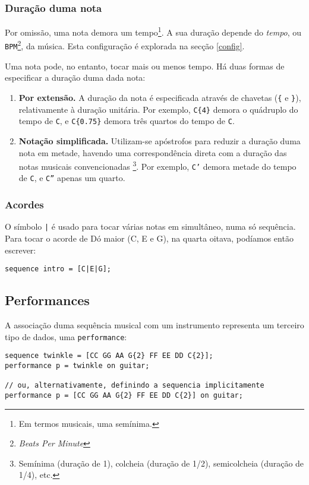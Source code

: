 \documentclass{article}
\begin{document}
\subsubsection{Duração duma nota}
Por omissão, uma nota demora um tempo\footnote{Em termos musicais, uma semínima.}. A sua duração depende do \textit{tempo}, ou \texttt{BPM}\footnote{\textit{Beats Per Minute}}, da música. Esta configuração é explorada na secção \ref{config}.

Uma nota pode, no entanto, tocar mais ou menos tempo. Há duas formas de especificar a duração duma dada nota:
\begin{enumerate}
    \item \textbf{Por extensão.} A duração da nota é especificada através de chavetas (\texttt{\{} e \texttt{\}}), relativamente à duração unitária. Por exemplo, \texttt{C\{4\}} demora o quádruplo do tempo de \texttt{C}, e \texttt{C\{0.75\}} demora três quartos do tempo de \texttt{C}.
    \item \textbf{Notação simplificada.} Utilizam-se apóstrofos para reduzir a duração duma nota em metade, havendo uma correspondência direta com a duração das notas musicais convencionadas
    \footnote{Semínima (duração de 1), colcheia (duração de 1/2), semicolcheia (duração de 1/4), etc.}. 
    Por exemplo, \texttt{C'} demora metade do tempo de \texttt{C}, e \texttt{C''} apenas um quarto. 
\end{enumerate}



\subsubsection{Acordes}
O símbolo \texttt{|} é usado para tocar várias notas em simultâneo, numa só sequência.
Para tocar o acorde de Dó maior (C, E e G), na quarta oitava, podíamos então escrever:
\begin{lstlisting} 
sequence intro = [C|E|G];
\end{lstlisting}

\subsection{Performances}
A associação duma sequência musical com um instrumento representa um terceiro tipo de dados, uma \texttt{performance}:
\begin{lstlisting} 
sequence twinkle = [CC GG AA G{2} FF EE DD C{2}];
performance p = twinkle on guitar;

// ou, alternativamente, definindo a sequencia implicitamente
performance p = [CC GG AA G{2} FF EE DD C{2}] on guitar;
\end{lstlisting}
\end{document}

